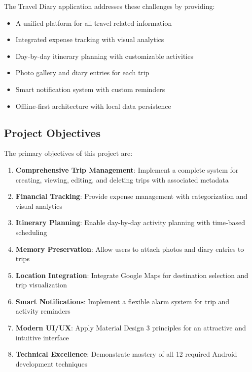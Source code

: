 \documentclass[12pt,a4paper]{article}
\begin{document}
The Travel Diary application addresses these challenges by providing:
\begin{itemize}
    \item A unified platform for all travel-related information
    \item Integrated expense tracking with visual analytics
    \item Day-by-day itinerary planning with customizable activities
    \item Photo gallery and diary entries for each trip
    \item Smart notification system with custom reminders
    \item Offline-first architecture with local data persistence
\end{itemize}

\subsection{Project Objectives}
The primary objectives of this project are:
\begin{enumerate}
    \item \textbf{Comprehensive Trip Management}: Implement a complete system for creating, viewing, editing, and deleting trips with associated metadata
    \item \textbf{Financial Tracking}: Provide expense management with categorization and visual analytics
    \item \textbf{Itinerary Planning}: Enable day-by-day activity planning with time-based scheduling
    \item \textbf{Memory Preservation}: Allow users to attach photos and diary entries to trips
    \item \textbf{Location Integration}: Integrate Google Maps for destination selection and trip visualization
    \item \textbf{Smart Notifications}: Implement a flexible alarm system for trip and activity reminders
    \item \textbf{Modern UI/UX}: Apply Material Design 3 principles for an attractive and intuitive interface
    \item \textbf{Technical Excellence}: Demonstrate mastery of all 12 required Android development techniques
\end{enumerate}
\end{document}
